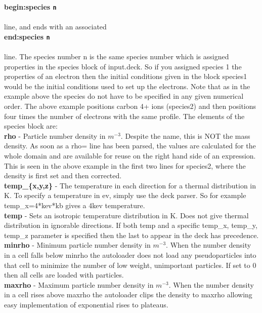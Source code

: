 \documentclass[12pt,a4paper]{article}
\newcommand{\emphtext}{\color{warwickdark} \fontfamily{phv}\selectfont\Large\bf}
\newcommand{\inlinecode}[1]{{\color{warwickred} \bf\texttt{#1}}}
\begin{document}
{\emphtext begin:species\inlinecode{n}}\\
\\
line, and ends with an associated\\

{\emphtext end:species\inlinecode{n}}\\
\\
line. The species number n is the same species number which is assigned
properties in the species block of input.deck. So if you assigned species 1 the
properties of an electron then the initial conditions given in the block
species1 would be the initial conditions used to set up the electrons. Note
that as in the example above the species do not have to be specified in any
given numerical order. The above example positions carbon 4+ ions (species2)
and then positions four times the number of electrons with the same
profile. The elements of the species block are:\\

{\emphtext rho} - Particle number density in $m^{-3}$. Despite the name, this
is NOT the mass density. As soon as a rho= line has been parsed, the values are
calculated for the whole domain and are available for reuse on the right hand
side of an expression. This is seen in the above example in the first two lines
for species2, where the density is first set and then corrected.\\

{\emphtext temp\_\{x,y,z\}} - The temperature in each direction for a thermal
distribution in K. To specify a temperature in ev, simply use the deck
parser. So for example temp\_x=4*kev*kb gives a 4kev temperature.\\

{\emphtext temp} - Sets an isotropic temperature distribution in K. Does not
give thermal distribution in ignorable directions. If both temp and a specific
temp\_x, temp\_y, temp\_z parameter is specified then the last to appear in the
deck has precedence.\\

{\emphtext minrho} - Minimum particle number density in $m^{-3}$. When the
number density in a cell falls below minrho the autoloader does not load any
pseudoparticles into that cell to minimize the number of low weight,
unimportant particles. If set to 0 then all cells are loaded with particles.\\

{\emphtext maxrho} - Maximum particle number density in $m^{-3}$. When the
number density in a cell rises above maxrho the autoloader clips the density to
maxrho allowing easy implementation of exponential rises to plateaus.\\
\end{document}
